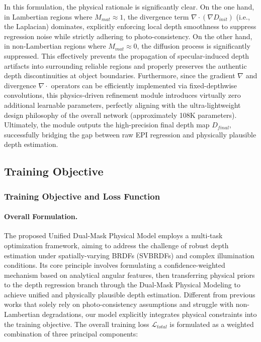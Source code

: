 \documentclass[lettersize,journal]{IEEEtran}
\begin{document}
In this formulation, the physical rationale is significantly clear. On the one hand, in Lambertian regions where $M_{mat} \approx 1$, the divergence term $\nabla \cdot (\nabla D_{init})$ (i.e., the Laplacian) dominates, explicitly enforcing local depth smoothness to suppress regression noise while strictly adhering to photo-consistency. On the other hand, in non-Lambertian regions where $M_{mat} \approx 0$, the diffusion process is significantly suppressed. This effectively prevents the propagation of specular-induced depth artifacts into surrounding reliable regions and properly preserves the authentic depth discontinuities at object boundaries. Furthermore, since the gradient $\nabla$ and divergence $\nabla \cdot$ operators can be efficiently implemented via fixed-depthwise convolutions, this physics-driven refinement module introduces virtually zero additional learnable parameters, perfectly aligning with the ultra-lightweight design philosophy of the overall network (approximately 108K parameters). Ultimately, the module outputs the high-precision final depth map $D_{final}$, successfully bridging the gap between raw EPI regression and physically plausible depth estimation.

\subsection{Training Objective}

\subsubsection{Training Objective and Loss Function}

\paragraph{Overall Formulation.}
The proposed Unified Dual-Mask Physical Model employs a multi-task optimization framework, aiming to address the challenge of robust depth estimation under spatially-varying BRDFs (SVBRDFs) and complex illumination conditions. Its core principle involves formulating a confidence-weighted mechanism based on analytical angular features, then transferring physical priors to the depth regression branch through the Dual-Mask Physical Modeling to achieve unified and physically plausible depth estimation. Different from previous works that solely rely on photo-consistency assumptions and struggle with non-Lambertian degradations, our model explicitly integrates physical constraints into the training objective. The overall training loss $\mathcal{L}_{total}$ is formulated as a weighted combination of three principal components:
\end{document}
